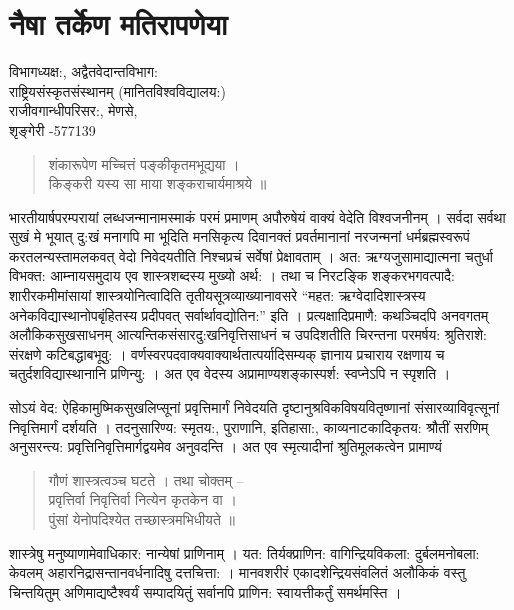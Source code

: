 \chapter{नैषा तर्केण मतिरापणेया}

\begin{center}
\smallskip

विभागध्यक्ष:, अद्वैतवेदान्तविभाग:\\
राष्ट्रियसंस्कृतसंस्थानम् (मानितविश्वविद्यालय:)\\
राजीवगान्धीपरिसर:, मेणसे,\\ 
शृङ्गेरी -577139
\addrule
\end{center}

\begin{verse}
शंकारूपेण मच्चित्तं पङ्कीकृतमभूद्यया ।\\
किङ्करी यस्य सा माया शङ्कराचार्यमाश्रये ॥
\end{verse}

भारतीयार्षपरम्परायां लब्धजन्मानामस्माकं परमं प्रमाणम् अपौरुषेयं वाक्यं वेदेति विश्वजनीनम् । सर्वदा सर्वथा सुखं मे भूयात् दु:खं मनागपि मा  भूदिति मनसिकृत्य दिवानक्तं प्रवर्तमानानां नरजन्मनां धर्मब्रह्मस्वरूपं करतलन्यस्तामलकवत् वेदो निवेदयतीति निश्चप्रचं सर्वेषां प्रेक्षावताम् । अत: ऋग्यजुसामाद्यात्मना चतुर्धा विभक्त: आम्नायसमुदाय एव शास्त्रशब्दस्य मुख्यो अर्थ: । तथा च निरटङ्कि शङ्करभगवत्पादै: शारीरकमीमांसायां शास्त्रयोनित्वादिति तृतीयसूत्रव्याख्यानावसरे “महत: ऋग्वेदादिशास्त्रस्य अनेकविद्यास्थानोपबृंहितस्य प्रदीपवत् सर्वार्थावद्योतिन:” इति । प्रत्यक्षादिप्रमाणै: कथञ्चिदपि अनवगतम् अलौकिकसुखसाधनम् आत्यन्तिकसंसारदु:खनिवृत्तिसाधनं च उपदिशतीति चिरन्तना परमर्षय: श्रुतिराशे: संरक्षणे कटिबद्धाबभूवु: । वर्णस्वरपदवाक्यवाक्यार्थतात्पर्यादिसम्यक् ज्ञानाय प्रचाराय रक्षणाय च चतुर्दशविद्यास्थानानि प्रणिन्यु: । अत एव वेदस्य अप्रामाण्यशङ्कास्पर्श: स्वप्नेऽपि न स्पृशति ।

सोऽयं वेद: ऐहिकामुष्मिकसुखलिप्सूनां प्रवृत्तिमार्गं निवेदयति दृष्टानुश्रविकविषयवितृष्णानां संसारव्याविवृत्सूनां निवृत्तिमार्गं दर्शयति । तदनुसारिण्य: स्मृतय:, पुराणानि, इतिहासा:, काव्यनाटकादिकृतय: श्रौतीं सरणिम् अनुसरन्त्य: प्रवृत्तिनिवृत्तिमार्गद्वयमेव अनुवदन्ति । अत एव स्मृत्यादीनां श्रुतिमूलकत्वेन प्रामाण्यं
\begin{verse}
गौणं शास्त्रत्वञ्च घटते । तथा चोक्तम् –\\
प्रवृत्तिर्वा निवृत्तिर्वा नित्येन कृतकेन वा ।\\
पुंसां येनोपदिश्येत तच्छास्त्रमभिधीयते ॥
\end{verse}

शास्त्रेषु मनुष्याणामेवाधिकार: नान्येषां प्राणिनाम् । यत: तिर्यक्प्राणिन: वागिन्द्रियविकला: दुर्बलमनोबला: केवलम् अहारनिद्रासन्तानवर्धनादिषु दत्तचित्ता: । मानवशरीरं एकादशेन्द्रियसंवलितं अलौकिकं वस्तु चिन्तयितुम् अणिमाद्यष्टैश्वर्यं सम्पादयितुं सर्वानपि प्राणिन: स्वायत्तीकर्तुं समर्थमस्ति ।

